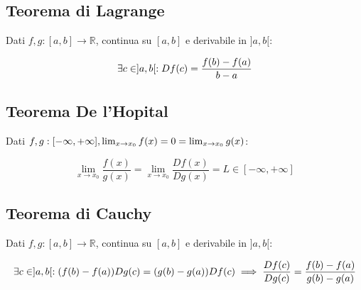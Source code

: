 \documentclass{subfiles}
\begin{document}
\subsection{Teorema di Lagrange}

Dati $f,g : [a,b] \to \mathbb{R}$, continua su $[a,b]$ e derivabile in $]a,b[$:

$$
\exists \space c \in \space ]a,b[ \space : Df(c) = \frac{f(b)- f(a)}{b - a}
$$

\subsection{Teorema De l'Hopital}

Dati $f,g : [-\infty,+\infty], \space \lim_{x \to x_0} f(x) = 0 = \lim_{x \to x_0} g(x)$:

$$
\lim_{x \to x_0} \frac{f(x)}{g(x)} =
\lim_{x \to x_0} \frac{Df(x)}{Dg(x)} =
L \in [-\infty,+\infty]
$$

\subsection{Teorema di Cauchy}

Dati $f,g : [a,b] \to \mathbb{R}$, continua su $[a,b]$ e derivabile in $]a,b[$:

$$
\exists \space c \in \space ]a,b[ \space :
(f(b) - f(a))Dg(c) = (g(b) - g(a))Df(c) \implies
\frac{Df(c)}{Dg(c)} = \frac{f(b) - f(a)}{g(b) - g(a)}
$$
\end{document}
